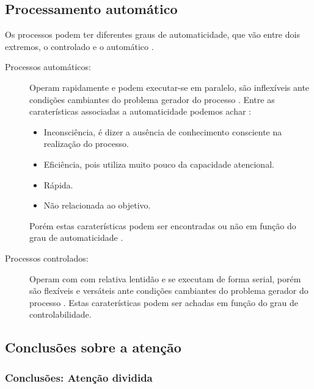 \subsection{Processamento automático}
Os processos podem ter diferentes graus de automaticidade,
que vão entre dois extremos, o controlado e o automático \cite[pp. 201]{eysenck2017manual}.
\begin{description}
\item[Processos automáticos:] Operam rapidamente e podem executar-se em paralelo, 
são inflexíveis ante condições cambiantes do problema gerador do processo
 \cite[pp. 198]{eysenck2017manual}.
Entre as caraterísticas associadas a automaticidade podemos achar \cite[pp. 198]{eysenck2017manual}:
\begin{itemize}
\item Inconsciência, é dizer a ausência de conhecimento consciente na realização do processo.
\item Eficiência, pois utiliza muito pouco da capacidade atencional.
\item Rápida.
\item Não relacionada ao objetivo.
\end{itemize}
Porém estas caraterísticas podem ser encontradas ou não 
em função do grau de automaticidade  \cite[pp. 198]{eysenck2017manual}.
\item[Processos controlados:] Operam com com relativa lentidão e se executam de forma serial, 
porém são flexíveis e versáteis ante condições cambiantes do problema gerador do processo
 \cite[pp. 198]{eysenck2017manual}.
Estas caraterísticas podem ser achadas em função do grau de controlabilidade.
\end{description}

\subsection{Conclusões sobre a atenção}
\label{subsec:atencaodividida}

\subsubsection{Conclusões: Atenção  dividida }

